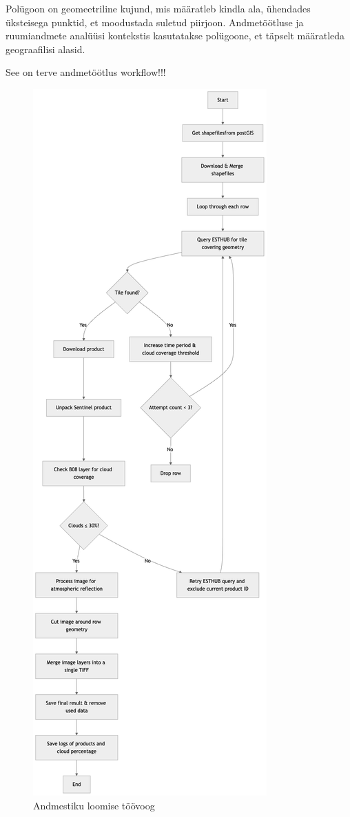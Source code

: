 Polügoon on geomeetriline kujund, mis määratleb kindla ala, ühendades üksteisega
punktid, et moodustada suletud piirjoon. Andmetöötluse ja ruumiandmete analüüsi
kontekstis kasutatakse polügoone, et täpselt määratleda geograafilisi alasid. \cite{WhatLocationPolygon}

See on terve andmetöötlus workflow!!!
\begin{figure}[H]
    \centering
    \includegraphics[width=.3\textwidth]{figures/andmestik/andmete_voog.drawio.png}
    \caption{Andmestiku loomise töövoog}
    \label{fig:terveflow}
\end{figure}

